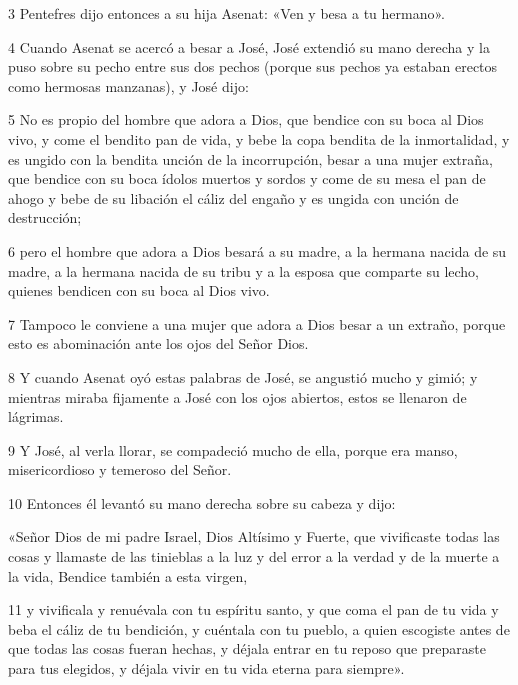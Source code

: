 \par 3 Pentefres dijo entonces a su hija Asenat: «Ven y besa a tu hermano».

\par 4 Cuando Asenat se acercó a besar a José, José extendió su mano derecha y la puso sobre su pecho entre sus dos pechos (porque sus pechos ya estaban erectos como hermosas manzanas), y José dijo:

\par 5 No es propio del hombre que adora a Dios, que bendice con su boca al Dios vivo, y come el bendito pan de vida, y bebe la copa bendita de la inmortalidad, y es ungido con la bendita unción de la incorrupción, besar a una mujer extraña, que bendice con su boca ídolos muertos y sordos y come de su mesa el pan de ahogo y bebe de su libación el cáliz del engaño y es ungida con unción de destrucción;

\par 6 pero el hombre que adora a Dios besará a su madre, a la hermana nacida de su madre, a la hermana nacida de su tribu y a la esposa que comparte su lecho, quienes bendicen con su boca al Dios vivo.

\par 7 Tampoco le conviene a una mujer que adora a Dios besar a un extraño, porque esto es abominación ante los ojos del Señor Dios.

\par 8 Y cuando Asenat oyó estas palabras de José, se angustió mucho y gimió; y mientras miraba fijamente a José con los ojos abiertos, estos se llenaron de lágrimas.

\par 9 Y José, al verla llorar, se compadeció mucho de ella, porque era manso, misericordioso y temeroso del Señor.

\par 10 Entonces él levantó su mano derecha sobre su cabeza y dijo:

«Señor Dios de mi padre Israel, Dios Altísimo y Fuerte,
que vivificaste todas las cosas y llamaste de las tinieblas a la luz
y del error a la verdad y de la muerte a la vida,
Bendice también a esta virgen,

\par 11 y vivificala y renuévala con tu espíritu santo,
y que coma el pan de tu vida y beba el cáliz de tu bendición,
y cuéntala con tu pueblo, a quien escogiste antes de que todas las cosas fueran hechas,
y déjala entrar en tu reposo que preparaste para tus elegidos,
y déjala vivir en tu vida eterna para siempre».

